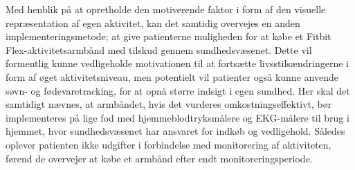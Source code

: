 Med henblik på at opretholde den motiverende faktor i form af den visuelle repræsentation af egen aktivitet, kan det samtidig overvejes en anden implementeringsmetode; at give patienterne muligheden for at købe et Fitbit Flex-aktivitetsarmbånd med tilskud gennem sundhedsvæsenet. Dette vil formentlig kunne vedligeholde motivationen til at fortsætte livsstilsændringerne i form af øget aktivitetsniveau, men potentielt vil patienter også kunne anvende søvn- og fødevaretracking, for at opnå større indsigt i egen sundhed. Her skal det samtidigt nævnes, at armbåndet, hvis det vurderes omkostningseffektivt, bør implementeres på lige fod med hjemmeblodtryksmålere og EKG-målere til brug i hjemmet, hvor sundhedsvæsenet har ansvaret for indkøb og vedligehold. Således oplever patienten ikke udgifter i forbindelse med monitorering af aktiviteten, førend de overvejer at købe et armbånd efter endt monitoreringsperiode.